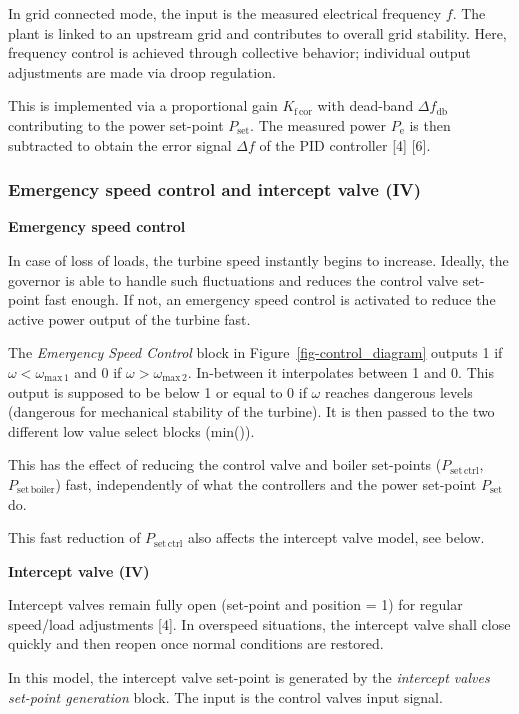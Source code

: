 \documentclass[
  a4paper,
  DIV=11,
  numbers=noendperiod]{scrartcl}
\begin{document}
In grid connected mode, the input is the measured electrical frequency
\(f\). The plant is linked to an upstream grid and contributes to
overall grid stability. Here, frequency control is achieved through
collective behavior; individual output adjustments are made via droop
regulation.

This is implemented via a proportional gain \(K_\mathrm{f\,cor}\) with
dead-band \(\Delta f_\mathrm{db}\) contributing to the power set-point
\(P_\mathrm{set}\). The measured power \(P_\mathrm{e}\) is then
subtracted to obtain the error signal \(\Delta f\) of the PID controller
{[}4{]} {[}6{]}.

\subsubsection{Emergency speed control and intercept valve
(IV)}\label{sec-emergency}

\textbf{Emergency speed control}

In case of loss of loads, the turbine speed instantly begins to
increase. Ideally, the governor is able to handle such fluctuations and
reduces the control valve set-point fast enough. If not, an emergency
speed control is activated to reduce the active power output of the
turbine fast.

The \emph{Emergency Speed Control} block in
Figure~\ref{fig-control_diagram} outputs 1 if
\(\omega < \omega_\mathrm{max\,1}\) and 0 if
\(\omega > \omega_\mathrm{max\,2}\). In-between it interpolates between
1 and 0. This output is supposed to be below 1 or equal to 0 if
\(\omega\) reaches dangerous levels (dangerous for mechanical stability
of the turbine). It is then passed to the two different low value select
blocks (min()).

This has the effect of reducing the control valve and boiler set-points
(\(P_\mathrm{set\,ctrl}\), \(P_\mathrm{set\,boiler}\)) fast,
independently of what the controllers and the power set-point
\(P_\mathrm{set}\) do.

This fast reduction of \(P_\mathrm{set\,ctrl}\) also affects the
intercept valve model, see below.

\textbf{Intercept valve (IV)}

Intercept valves remain fully open (set-point and position = 1) for
regular speed/load adjustments {[}4{]}. In overspeed situations, the
intercept valve shall close quickly and then reopen once normal
conditions are restored.

In this model, the intercept valve set-point is generated by the
\emph{intercept valves set-point generation} block. The input is the
control valves input signal.
\end{document}
